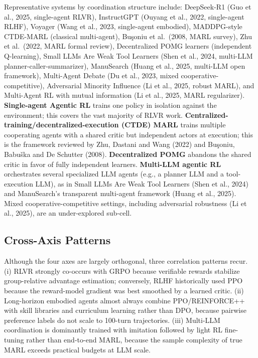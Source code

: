 Representative systems by coordination structure include: DeepSeek-R1 (Guo et al., 2025, single-agent RLVR), InstructGPT (Ouyang et al., 2022, single-agent RLHF), Voyager (Wang et al., 2023, single-agent embodied), MADDPG-style CTDE-MARL (classical multi-agent), Buşoniu et al.~(2008, MARL survey), Zhu et al.~(2022, MARL formal review), Decentralized POMG learners (independent Q-learning), Small LLMs Are Weak Tool Learners (Shen et al., 2024, multi-LLM planner-caller-summarizer), ManuSearch (Huang et al., 2025, multi-LLM open framework), Multi-Agent Debate (Du et al., 2023, mixed cooperative-competitive), Adversarial Minority Influence (Li et al., 2025, robust MARL), and Multi-Agent RL with mutual information (Li et al., 2025, MARL regularizer). \textbf{Single-agent Agentic RL} trains one policy in isolation against the environment; this covers the vast majority of RLVR work. \textbf{Centralized-training/decentralized-execution (CTDE) MARL} trains multiple cooperating agents with a shared critic but independent actors at execution; this is the framework reviewed by Zhu, Dastani and Wang (2022) and Buşoniu, Babuška and De Schutter (2008). \textbf{Decentralized POMG} abandons the shared critic in favor of fully independent learners. \textbf{Multi-LLM agentic RL} orchestrates several specialized LLM agents (e.g., a planner LLM and a tool-execution LLM), as in Small LLMs Are Weak Tool Learners (Shen et al., 2024) and ManuSearch's transparent multi-agent framework (Huang et al., 2025). Mixed cooperative-competitive settings, including adversarial robustness (Li et al., 2025), are an under-explored sub-cell.

\subsection{Cross-Axis Patterns}\label{cross-axis-patterns}

Although the four axes are largely orthogonal, three correlation patterns recur. (i) RLVR strongly co-occurs with GRPO because verifiable rewards stabilize group-relative advantage estimation; conversely, RLHF historically used PPO because the reward-model gradient was best smoothed by a learned critic. (ii) Long-horizon embodied agents almost always combine PPO/REINFORCE++ with skill libraries and curriculum learning rather than DPO, because pairwise preference labels do not scale to 100-turn trajectories. (iii) Multi-LLM coordination is dominantly trained with imitation followed by light RL fine-tuning rather than end-to-end MARL, because the sample complexity of true MARL exceeds practical budgets at LLM scale.

